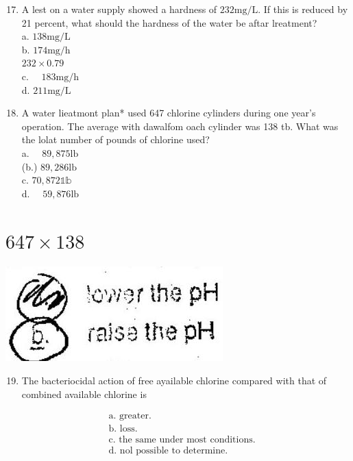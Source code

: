 \documentclass[10pt]{article}
\begin{document}
\begin{enumerate}
  \setcounter{enumi}{16}
  \item A lest on a water supply showed a hardness of $232 \mathrm{mg} / \mathrm{L}$. If this is reduced by 21 percent, what should the hardness of the water be aftar lreatment?\\
a. $138 \mathrm{mg} / \mathrm{L}$\\
b. $174 \mathrm{mg} / \mathrm{h}$\\
$232 \times 0.79$\\
c. $\quad 183 \mathrm{mg} / \mathrm{h}$\\
d. $211 \mathrm{mg} / \mathrm{L}$

  \item A water lieatmont plan* used 647 chlorine cylinders during one year's operation. The average with dawalfom oach cylinder was 138 tb. What was the lolat number of pounds of chlorine used?\\
a. $\quad 89,875 \mathrm{lb}$\\
(b.) $89,286 \mathrm{lb}$\\
c. $70,872 \mathbb{1 b}$\\
d. $\quad 59,876 \mathrm{lb}$

\end{enumerate}

\section{$647 \times 138$}
\includegraphics[max width=\textwidth]{2022_11_11_ca6a6c1a0324ee23e523g-03(2)}

\begin{enumerate}
  \setcounter{enumi}{18}
  \item The bacteriocidal action of free ayailable chlorine compared with that of combined available chlorine is
\end{enumerate}

$$
\begin{aligned}
&\text { a. greater. } \\
&\text { b. loss. } \\
&\text { c. the same under most conditions. } \\
&\text { d. nol possible to determine. }
\end{aligned}
$$
\end{document}
